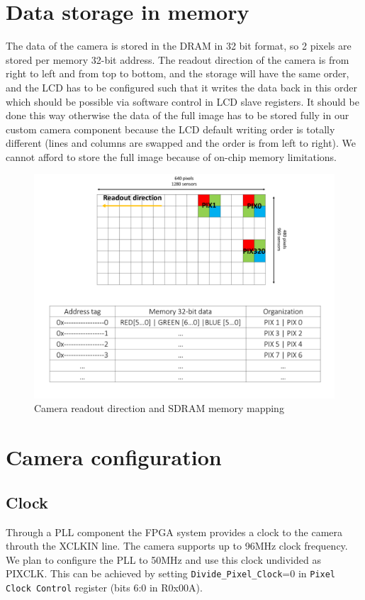 \documentclass{article}
\begin{document}
\section{Data storage in memory}

The data of the camera is stored in the DRAM in 32 bit format, so 2 pixels are stored per memory 32-bit address. The readout direction of the camera is from right to left and from top to bottom, and the storage will have the same order, and the LCD has to be configured such that it writes the data back in this order which should be possible via software control in LCD slave registers. It should be done this way otherwise the data of the full image has to be stored fully in our custom camera component because the LCD default writing order is totally different (lines and columns are swapped and the order is from left to right). We cannot afford to store the full image because of on-chip memory limitations. 

\begin{figure}[H]
\centering
\includegraphics[scale=0.5]{memory_mapping.png}
\caption{Camera readout direction and SDRAM memory mapping}
\label{fig:memory_mapping}
\end{figure}

\section{Camera configuration}

\subsection{Clock}
Through a PLL component the FPGA system provides a clock to the camera throuth the XCLKIN line. The camera supports up to 96MHz clock frequency. We plan to configure the PLL to 50MHz and use this clock undivided as PIXCLK. This can be achieved by setting \verb'Divide_Pixel_Clock'=0 in \verb'Pixel Clock Control' register (bits 6:0 in R0x00A).
\end{document}
